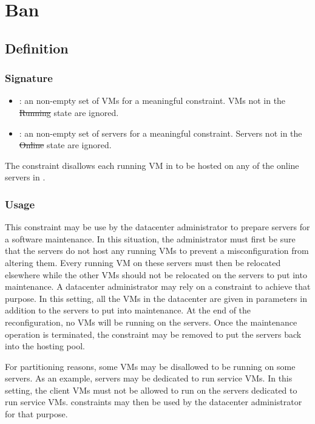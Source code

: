 \section{Ban}
\subsection{Definition}

\subsubsection{Signature} 

\begin{itemize}
\item {} : an non-empty set of VMs for a meaningful constraint. VMs not in the \st{Running} state are ignored.
\item {} : an non-empty set of servers for a meaningful constraint. Servers not in the \st{Online} state are ignored.
\end{itemize}

The  constraint disallows each running VM in  to be hosted on any of
the online servers in .


\subsubsection{Usage}

This constraint may be use by the datacenter administrator to prepare servers for a software maintenance.
In this situation, the administrator must first be sure that the servers do not host any running VMs to prevent a
misconfiguration from altering them. Every running VM on these servers must then be relocated elsewhere
while the other VMs should not be relocated on the servers to put into maintenance.
%
A datacenter administrator may rely on a  constraint to achieve that purpose. In this setting, all
the VMs in the datacenter are given in parameters in addition to the servers to put into maintenance. At the end
of the reconfiguration, no VMs will be running on the servers.  Once the maintenance operation is terminated,
the constraint may be removed to put the servers back into the hosting pool.

For partitioning reasons, some VMs may be disallowed to be running on some servers.  As an example, servers may be dedicated to run service VMs. In this setting, the client VMs must not be allowed to run on the servers dedicated to run service VMs.  constraints may then be used by the datacenter administrator for that purpose.


